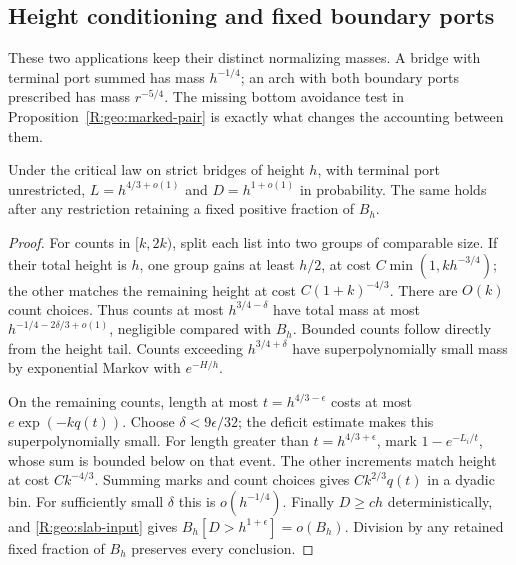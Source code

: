 \subsection{Height conditioning and fixed boundary ports}

These two applications keep their distinct normalizing masses.  A
bridge with terminal port summed has mass $h^{-1/4}$; an arch with
both boundary ports prescribed has mass $r^{-5/4}$.  The missing
bottom avoidance test in Proposition~\ref{R:geo:marked-pair} is
exactly what changes the accounting between them.

\begin{proposition}\label{R:geo:fixed-height}
Under the critical law on strict bridges of height $h$, with terminal
port unrestricted, $L=h^{4/3+o(1)}$ and $D=h^{1+o(1)}$ in probability.
The same holds after any restriction retaining a fixed positive
fraction of $B_h$.
\end{proposition}
\begin{proof}
For counts in $[k,2k)$, split each list into two groups of comparable
size.  If their total height is $h$, one group gains at least $h/2$,
at cost $C\min(1,k h^{-3/4})$; the other matches the remaining
height at cost $C(1+k)^{-4/3}$.  There are $O(k)$ count choices.
Thus counts at most $h^{3/4-\delta}$ have total mass at most
$h^{-1/4-2\delta/3+o(1)}$, negligible compared with $B_h$.
Bounded counts follow directly from the height tail.  Counts exceeding
$h^{3/4+\delta}$ have superpolynomially small mass by exponential
Markov with $e^{-H/h}$.

On the remaining counts, length at most $t=h^{4/3-\epsilon}$ costs
at most $e\exp(-k q(t))$.  Choose $\delta<9\epsilon/32$; the
deficit estimate makes this superpolynomially small.  For length
greater than $t=h^{4/3+\epsilon}$, mark
$1-e^{-L_i/t}$, whose sum is bounded below on that event.  The other
increments match height at cost $Ck^{-4/3}$.  Summing marks and count
choices gives $Ck^{2/3}q(t)$ in a dyadic bin.  For sufficiently small
$\delta$ this is $o(h^{-1/4})$.  Finally $D\ge c h$
deterministically, and \eqref{R:geo:slab-input} gives
$B_h[D>h^{1+\epsilon}]=o(B_h)$.  Division by any retained fixed
fraction of $B_h$ preserves every conclusion.
\end{proof}

